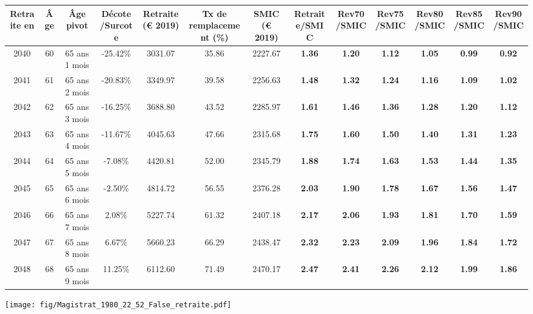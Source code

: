 { \scriptsize \begin{center} 
\begin{tabular}[htb]{|c|c||c|c||c|c||c||c|c|c|c|c|c|} 
\hline 
 Retraite en &  Âge &  Âge pivot &  Décote/Surcote &  Retraite (\euro{} 2019) &  Tx de remplacement (\%) &  SMIC (\euro{} 2019) &  Retraite/SMIC &  Rev70/SMIC &  Rev75/SMIC &  Rev80/SMIC &  Rev85/SMIC &  Rev90/SMIC \\ 
\hline \hline 
 2040 &  60 &  65 ans 1 mois &  -25.42\% &  3031.07 &  35.86 &  2227.67 &  {\bf 1.36} &  {\bf 1.20} &  {\bf 1.12} &  {\bf 1.05} &  {\bf {\color{red} 0.99}} &  {\bf {\color{red} 0.92}} \\ 
\hline 
 2041 &  61 &  65 ans 2 mois &  -20.83\% &  3349.97 &  39.58 &  2256.63 &  {\bf 1.48} &  {\bf 1.32} &  {\bf 1.24} &  {\bf 1.16} &  {\bf 1.09} &  {\bf 1.02} \\ 
\hline 
 2042 &  62 &  65 ans 3 mois &  -16.25\% &  3688.80 &  43.52 &  2285.97 &  {\bf 1.61} &  {\bf 1.46} &  {\bf 1.36} &  {\bf 1.28} &  {\bf 1.20} &  {\bf 1.12} \\ 
\hline 
 2043 &  63 &  65 ans 4 mois &  -11.67\% &  4045.63 &  47.66 &  2315.68 &  {\bf 1.75} &  {\bf 1.60} &  {\bf 1.50} &  {\bf 1.40} &  {\bf 1.31} &  {\bf 1.23} \\ 
\hline 
 2044 &  64 &  65 ans 5 mois &  -7.08\% &  4420.81 &  52.00 &  2345.79 &  {\bf 1.88} &  {\bf 1.74} &  {\bf 1.63} &  {\bf 1.53} &  {\bf 1.44} &  {\bf 1.35} \\ 
\hline 
 2045 &  65 &  65 ans 6 mois &  -2.50\% &  4814.72 &  56.55 &  2376.28 &  {\bf 2.03} &  {\bf 1.90} &  {\bf 1.78} &  {\bf 1.67} &  {\bf 1.56} &  {\bf 1.47} \\ 
\hline 
 2046 &  66 &  65 ans 7 mois &  2.08\% &  5227.74 &  61.32 &  2407.18 &  {\bf 2.17} &  {\bf 2.06} &  {\bf 1.93} &  {\bf 1.81} &  {\bf 1.70} &  {\bf 1.59} \\ 
\hline 
 2047 &  67 &  65 ans 8 mois &  6.67\% &  5660.23 &  66.29 &  2438.47 &  {\bf 2.32} &  {\bf 2.23} &  {\bf 2.09} &  {\bf 1.96} &  {\bf 1.84} &  {\bf 1.72} \\ 
\hline 
 2048 &  68 &  65 ans 9 mois &  11.25\% &  6112.60 &  71.49 &  2470.17 &  {\bf 2.47} &  {\bf 2.41} &  {\bf 2.26} &  {\bf 2.12} &  {\bf 1.99} &  {\bf 1.86} \\ 
\hline 
\hline 
\end{tabular} 
\end{center} } 

 \begin{center}\texttt{[image: fig/Magistrat\_1980\_22\_52\_False\_retraite.pdf]}\end{center} 

